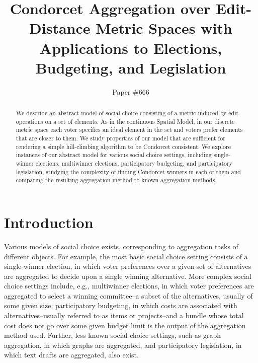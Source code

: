 \documentclass[sigconf]{aamas}  %
\begin{document}
\pagestyle{plain}


\title{Condorcet Aggregation over Edit-Distance Metric Spaces with Applications to Elections, Budgeting, and Legislation}


\author{
  Paper $\#666$
}


\begin{abstract}
%
We describe an abstract model of social choice consisting of a metric induced by edit operations on a set of elements.  As in the continuous Spatial Model, in our discrete metric space each voter specifies an ideal element in the set and voters prefer elements that are closer to them.
We study properties of our model that are sufficient for rendering a simple hill-climbing algorithm to be Condorcet consistent.
We explore instances of our abstract model for various social choice settings, including single-winner elections, multiwinner elections, participatory budgeting, and participatory legislation, studying the complexity of finding Condorcet winners in each of them and comparing the resulting aggregation method to known aggregation methods.
%
\end{abstract}




\maketitle


\section{Introduction}

Various models of social choice exists,
corresponding to aggregation tasks of different objects.
For example, the most basic social choice setting consists of a single-winner election, in which voter preferences over a given set of alternatives are aggregated to decide upon a single winning alternative.
More complex social choice settings include, e.g., multiwinner elections, in which voter preferences are aggregated to select a winning committee--a subset of the alternatives, usually of some given size;
participatory budgeting, in which costs are associated with alternatives--usually referred to as items or projects--and a bundle whose total cost does not go over some given budget limit is the output of the aggregation method used. Further, less known social choice settings, such as graph aggregation, in which graphs are aggregated, and participatory legislation, in which text drafts are aggregated, also exist.
\end{document}

